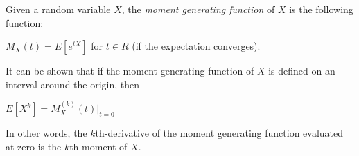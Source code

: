 \documentclass{article}
\begin{document}

Given a random variable $X$, the \emph{moment generating function} of $X$ is the following function:\\
\par
$M_X(t) = E[e^{tX}]$ for $t \in R$ (if the expectation converges).
\par
\par
It can be shown that if the moment generating function of $X$ is defined on an interval around the origin, then\\
\par
$E[X^k] = M_X^{(k)}(t) |_{t=0} $\\
\par
In other words, the $k$th-derivative of the moment generating function evaluated at zero is the $k$th moment of $X$.
\end{document}
